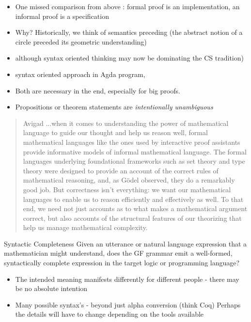 \documentclass[10pt]{beamer}
\begin{document}
\begin{frame}

\begin{itemize}
\item One missed comparison from above :  formal proof is an implementation, an informal proof is a specification

\item Why? Historically, we think of semantics preceding (the abstract notion of a
  circle preceded its geometric understanding)
\item although syntax oriented thinking may now be dominating the CS tradition)
\item syntax oriented approach in Agda program,
\item Both are necessary in the end, especially for big proofs.
\item  Propositions or theorem statements are \emph{intentionally unambiguous}

\end{itemize}


\end{frame}

\begin{frame}
\begin{quote}{Avigad}
...when it comes to understanding the power of mathematical language to guide
our thought and help us reason well, formal mathematical languages like the ones
used by interactive proof assistants provide informative models of informal
mathematical language. The formal languages underlying foundational frameworks
such as set theory and type theory were designed to provide an account of the
correct rules of mathematical reasoning, and, as Gödel observed, they do a
remarkably good job. But correctness isn’t everything: we want our mathematical
languages to enable us to reason efficiently and effectively as well. To that
end, we need not just accounts as to what makes a mathematical argument correct,
but also accounts of the structural features of our theorizing that help us
manage mathematical complexity.
\end{quote}
\end{frame}

\begin{frame}
\begin{block}{Syntactic Completeness}
Given an utterance or natural language expression that a mathematician might
understand, does the GF grammar emit a well-formed, syntactically complete
expression in the target logic or programming language?
\end{block}

\begin{itemize}

\item The intended meaning manifests differently for different people - there
  may be no absolute intention
\item Many possible syntax's - beyond just alpha conversion (think Coq) Perhaps the details will have to change depending on the tools available

\end{itemize}

\end{frame}
\end{document}
